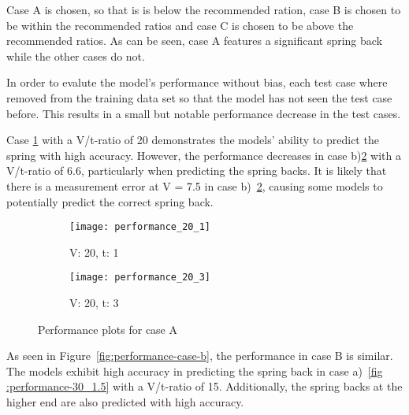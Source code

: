 Case A is chosen, so that is is below the recommended ration, case B is chosen to be
within the recommended ratios and case C is chosen to be above the recommended ratios.
As can be seen, case A features a significant spring back while the other cases do not.

In order to evalute the model's performance without bias, each test case where removed
from
the training data set so that the model has not seen the test case before.
This results in a small but notable performance decrease in the test cases.
%

Case \ref{fig:performance-20-1} with a V/t-ratio of 20 demonstrates the models'
ability to predict the spring with high accuracy.
However, the performance decreases in case b)\ref{fig:performance-20-3} with a V/t-ratio
of 6.6, particularly when predicting the spring backs.
It is likely that there is a measurement error at V = 7.5 in case
b)~\ref{fig:performance-20-3}, causing some models to potentially predict the correct
spring back.

\begin{figure}[H]
    \begin{tcolorbox}[arc=0pt,boxrule=0.5pt]
        \begin{subfigure}{0.5\textwidth}
            \texttt{[image: performance\_20\_1]}
            \caption{V: 20, t: 1}
            \label{fig:performance-20-1}
        \end{subfigure}
        \hfill
        \begin{subfigure}{0.5\textwidth}
            \texttt{[image: performance\_20\_3]}
            \caption{V: 20, t: 3}
            \label{fig:performance-20-3}
        \end{subfigure}
    \end{tcolorbox}
    \label{fig:performance-case-a}
    \caption{Performance plots for case A}
\end{figure}

As seen in Figure~\ref{fig:performance-case-b}, the performance in case B is similar.
The models exhibit high accuracy in predicting the spring back in case a)~\ref{fig
:performance-30_1.5} with a V/t-ratio of 15. Additionally, the spring backs at the
higher end are also predicted with high accuracy.

